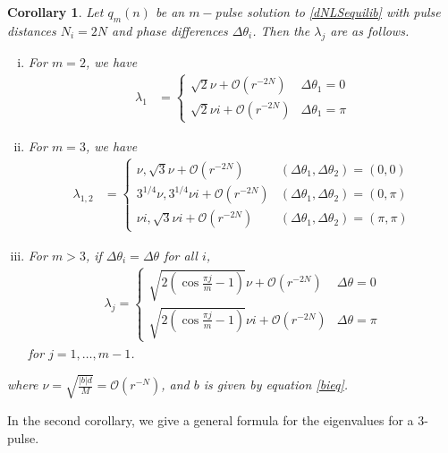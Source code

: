 \documentclass[12pt]{article}
\newtheorem{corollary}{Corollary}
\begin{document}
\begin{corollary}\label{dNLSeigcorr}Let $q_m(n)$ be an $m-$pulse solution to \eqref{dNLSequilib} with pulse distances $N_i = 2N$ and phase differences $\Delta\theta_i$. Then the $\lambda_j$ are as follows.
\begin{enumerate}[(i)]
\item For $m = 2$, we have
\begin{align}\label{2pulseeigs}
\lambda_1 &= 
\begin{cases}
\sqrt{2}\nu  + \mathcal{O}(r^{-2N}) & \Delta\theta_1 = 0 \\
\sqrt{2}\nu i + \mathcal{O}(r^{-2N}) & \Delta\theta_1 = \pi
\end{cases}
\end{align}
\item For $m = 3$, we have
\begin{align}\label{3pulseequaleigs}
\lambda_{1, 2} &= \begin{cases}
\nu, \sqrt{3} \nu + \mathcal{O}(r^{-2N}) & (\Delta\theta_1, \Delta\theta_2) = (0, 0) \\
3^{1/4}\nu, 3^{1/4}\nu i + \mathcal{O}(r^{-2N}) & (\Delta\theta_1, \Delta\theta_2) = (0, \pi) \\
\nu i, \sqrt{3} \nu i + \mathcal{O}(r^{-2N}) & (\Delta\theta_1, \Delta\theta_2) = (\pi, \pi)
\end{cases}
\end{align}
\item For $m > 3$, if $\Delta\theta_i = \Delta\theta$ for all $i$,
\begin{align*}
\lambda_j = \begin{cases}
\sqrt{2\left( \cos\frac{\pi j}{m} - 1 \right)}\nu + \mathcal{O}(r^{-2N}) & \Delta\theta = 0 \\
\sqrt{2\left( \cos\frac{\pi j}{m} - 1 \right)}\nu i + \mathcal{O}(r^{-2N}) & \Delta\theta = \pi
\end{cases}
\end{align*}
for $j = 1, \dots, m-1$.
\end{enumerate}
where $\nu = \sqrt{\frac{|b|d}{M}} = \mathcal{O}(r^{-N})$, and $b$ is given by equation \eqref{bieq}.
\end{corollary}

In the second corollary, we give a general formula for the eigenvalues for a 3-pulse.
\end{document}
